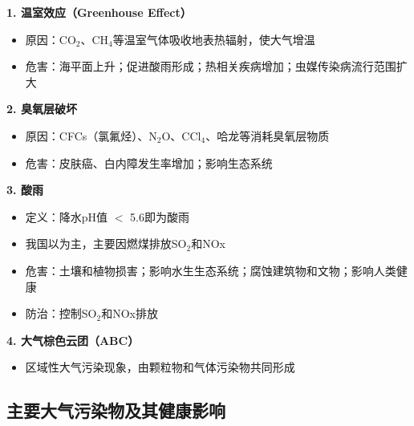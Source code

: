 \begin{keybox}
\textbf{1. 温室效应（Greenhouse Effect）}
\begin{itemize}[leftmargin=*]
    \item 原因：CO$_2$、CH$_4$等温室气体吸收地表热辐射，使大气增温
    \item 危害：海平面上升；促进酸雨形成；热相关疾病增加；虫媒传染病流行范围扩大
\end{itemize}

\textbf{2. 臭氧层破坏}
\begin{itemize}[leftmargin=*]
    \item 原因：CFCs（氯氟烃）、N$_2$O、CCl$_4$、哈龙等消耗臭氧层物质
    \item 危害：皮肤癌、白内障发生率增加；影响生态系统
\end{itemize}

\textbf{3. 酸雨}
\begin{itemize}[leftmargin=*]
    \item 定义：降水pH值 $<$ 5.6即为酸雨
    \item 我国以为主，主要因燃煤排放SO$_2$和NOx
    \item 危害：土壤和植物损害；影响水生生态系统；腐蚀建筑物和文物；影响人类健康
    \item 防治：控制SO$_2$和NOx排放
\end{itemize}

\textbf{4. 大气棕色云团（ABC）}
\begin{itemize}[leftmargin=*]
    \item 区域性大气污染现象，由颗粒物和气体污染物共同形成
\end{itemize}
\end{keybox}

\subsection{主要大气污染物及其健康影响}


